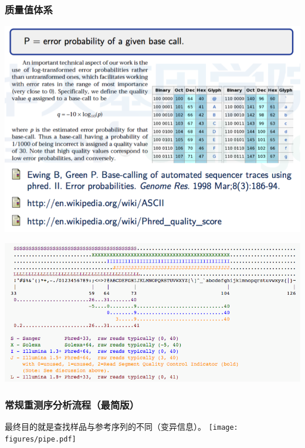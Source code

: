 \documentclass[12pt]{beamer}
\begin{document}
\begin{frame}\frametitle{质量值体系}
  \includegraphics[width=\textwidth]{figures/old_slides/qual1.png}
\end{frame}
\begin{frame}
  \includegraphics[width=\textwidth]{figures/qual.png}
\end{frame}

\begin{frame}\frametitle{常规重测序分析流程（最简版）}
最终目的就是查找样品与参考序列的不同（变异信息）。
\texttt{[image: figures/pipe.pdf]}
\end{frame}
\end{document}
